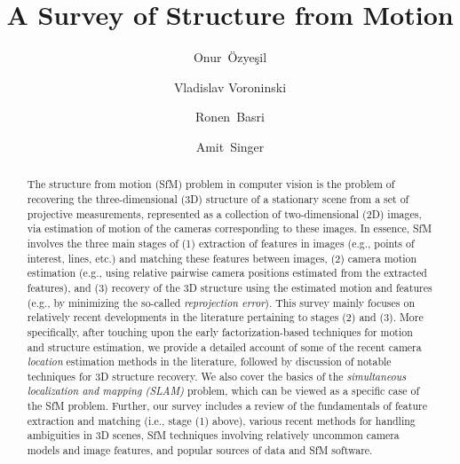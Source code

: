 \documentclass[10pt]{article}
\date{}
\title{A Survey of Structure from Motion}
\author{Onur~\"{O}zye\c{s}il\footnotemark[2]
\and Vladislav Voroninski\footnotemark[3]
\and Ronen~Basri\footnotemark[4]
\and Amit~Singer\footnotemark[5]}
\begin{document}
\maketitle

\renewcommand{\thefootnote}{\fnsymbol{footnote}}


\renewcommand{\thefootnote}{\arabic{footnote}}

\begin{abstract}
The structure from motion (SfM) problem in computer vision is the problem of recovering the three-dimensional ($3$D) structure of a stationary scene from a set of projective measurements, represented as a collection of two-dimensional ($2$D) images, via estimation of motion of the cameras corresponding to these images. In essence, SfM involves the three main stages of (1) extraction of features in images (e.g., points of interest, lines, etc.) and matching these features between images, (2) camera motion estimation (e.g., using relative pairwise camera positions estimated from the extracted features), and (3) recovery of the $3$D structure using the estimated motion and features (e.g., by minimizing the so-called \textit{reprojection error}). This survey mainly focuses on relatively recent developments in the literature pertaining to stages (2) and (3). More specifically, after touching upon the early factorization-based techniques for motion and structure estimation, we provide a detailed account of some of the recent camera \textit{location} estimation methods in the literature, followed by discussion of notable techniques for $3$D structure recovery. We also cover the basics of the \textit{simultaneous localization and mapping (SLAM)} problem, which can be viewed as a specific case of the SfM problem. Further, our survey includes a review of the fundamentals of feature extraction and matching (i.e., stage (1) above), various recent methods for handling ambiguities in $3$D scenes, SfM techniques involving relatively uncommon camera models and image features, and popular sources of data and SfM software.  
\end{abstract}
\end{document}
